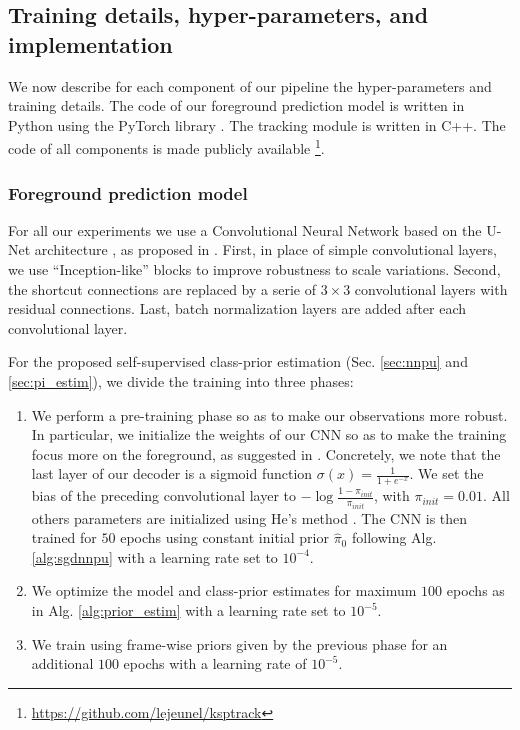 \subsection{Training details, hyper-parameters, and implementation}
We now describe for each component of our pipeline the hyper-parameters and training details.
The code of our foreground prediction model is written in Python using the PyTorch library \cite{paszke19}.
The tracking module is written in C++.
The code of all components is made publicly available \footnote{\url{https://github.com/lejeunel/ksptrack}}.

\subsubsection{Foreground prediction model}
For all our experiments we use a Convolutional Neural Network based on the U-Net architecture \cite{ronneberger15}, as proposed in \cite{ibtehaz20}.
First, in place of simple convolutional layers, we use ``Inception-like'' blocks \cite{szegedy16} to improve robustness to scale variations.
Second, the shortcut connections are replaced by a serie of $3\times3$ convolutional layers with residual connections.
Last, batch normalization layers \cite{ioffe15} are added after each convolutional layer.

For the proposed self-supervised class-prior estimation (Sec. \ref{sec:nnpu} and \ref{sec:pi_estim}), we divide the training into three phases:

\begin{enumerate}
  \item We perform a pre-training phase so as to make our observations more robust.
    In particular, we initialize the weights of our CNN so as to
    make the training focus more on the foreground, as suggested in \cite{lin17}.
    Concretely, we note that the last layer of our decoder is a sigmoid function $\sigma(x)=\frac{1}{1+e^{-x}}$.
    We set the bias of the preceding convolutional layer to $-\log{\frac{1-\pi_{init}}{\pi_{init}}}$, with $\pi_{init}=0.01$.
    All others parameters are initialized using He's method \cite{he15init}.
    The CNN is then trained for $50$ epochs using constant initial prior $\hat \pi_{0}$ following Alg. \ref{alg:sgdnnpu} with a learning rate set to $10^{-4}$.
    \item We optimize the model and class-prior estimates for maximum $100$ epochs as in Alg. \ref{alg:prior_estim} with a learning rate set to $10^{-5}$.
  \item We train using frame-wise priors given by the previous phase for an additional $100$ epochs with a learning rate of $10^{-5}$.
\end{enumerate}

